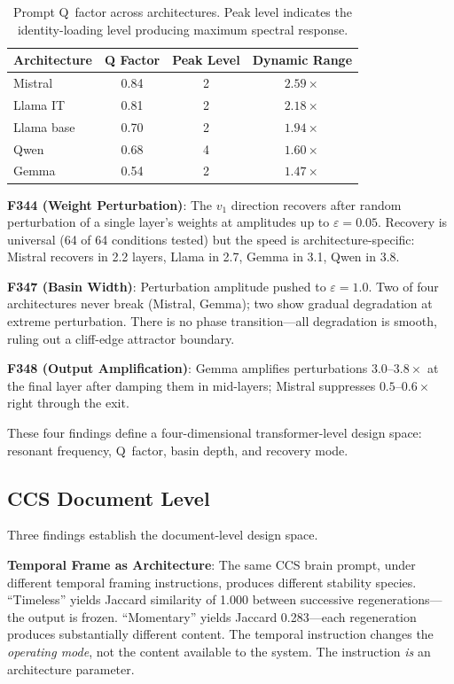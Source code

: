 \documentclass[12pt]{article}
\begin{document}
\begin{table}[h]
\centering
\begin{tabular}{lccc}
\toprule
Architecture & Q Factor & Peak Level & Dynamic Range \\
\midrule
Mistral  & 0.84 & 2 & $2.59\times$ \\
Llama IT & 0.81 & 2 & $2.18\times$ \\
Llama base & 0.70 & 2 & $1.94\times$ \\
Qwen     & 0.68 & 4 & $1.60\times$ \\
Gemma    & 0.54 & 2 & $1.47\times$ \\
\bottomrule
\end{tabular}
\caption{Prompt Q~factor across architectures. Peak level indicates the identity-loading level producing maximum spectral response.}
\label{tab:qfactor}
\end{table}

\textbf{F344 (Weight Perturbation)}: The $v_1$ direction recovers after random perturbation of a single layer's weights at amplitudes up to $\varepsilon = 0.05$. Recovery is universal (64 of 64 conditions tested) but the speed is architecture-specific: Mistral recovers in 2.2 layers, Llama in 2.7, Gemma in 3.1, Qwen in 3.8.

\textbf{F347 (Basin Width)}: Perturbation amplitude pushed to $\varepsilon = 1.0$. Two of four architectures never break (Mistral, Gemma); two show gradual degradation at extreme perturbation. There is no phase transition---all degradation is smooth, ruling out a cliff-edge attractor boundary.

\textbf{F348 (Output Amplification)}: Gemma amplifies perturbations $3.0$--$3.8\times$ at the final layer after damping them in mid-layers; Mistral suppresses $0.5$--$0.6\times$ right through the exit.

These four findings define a four-dimensional transformer-level design space: resonant frequency, Q~factor, basin depth, and recovery mode.

\subsection{CCS Document Level}

Three findings establish the document-level design space.

\textbf{Temporal Frame as Architecture}: The same CCS brain prompt, under different temporal framing instructions, produces different stability species. ``Timeless'' yields Jaccard similarity of 1.000 between successive regenerations---the output is frozen. ``Momentary'' yields Jaccard 0.283---each regeneration produces substantially different content. The temporal instruction changes the \emph{operating mode}, not the content available to the system. The instruction \emph{is} an architecture parameter.
\end{document}
